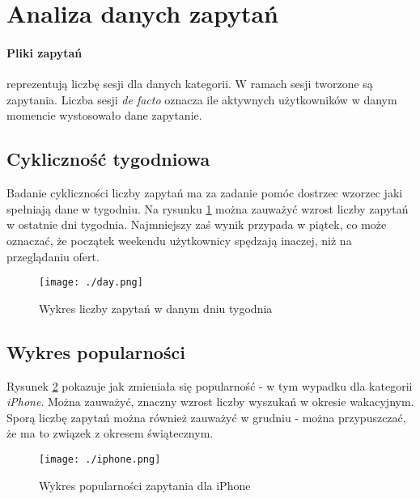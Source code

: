\documentclass[a4paper,11pt]{article}
\begin{document}
\section{Analiza danych zapytań} 
\paragraph{Pliki zapytań} reprezentują liczbę sesji dla danych kategorii. W ramach sesji tworzone są zapytania. Liczba sesji \textit{de facto} oznacza ile aktywnych użytkowników w danym momencie wystosowało dane zapytanie.


\subsection{Cykliczność tygodniowa}
Badanie cykliczności liczby zapytań ma za zadanie pomóc dostrzec wzorzec jaki spełniają dane w tygodniu. Na rysunku \ref{fig:day} można zauważyć wzrost liczby zapytań w ostatnie dni tygodnia. Najmniejszy zaś wynik przypada w piątek, co może oznaczać, że początek weekendu użytkownicy spędzają inaczej, niż na przeglądaniu ofert. 
   

\begin{figure}[H]
	\centering
	\texttt{[image: ./day.png]}
	\caption{\label{fig:day}Wykres liczby zapytań w danym dniu tygodnia}
\end{figure}

\subsection{Wykres popularności}
Rysunek \ref{fig:iphoine} pokazuje jak zmieniała się popularność - w tym wypadku dla kategorii \textit{iPhone}. Można zauważyć, znaczny wzrost liczby wyszukań w okresie wakacyjnym. Sporą liczbę zapytań można również zauważyć w grudniu - można przypuszczać, że ma to związek z okresem świątecznym.
   

\begin{figure}[H]
	\centering
	\texttt{[image: ./iphone.png]}
	\caption{\label{fig:iphoine}Wykres popularności zapytania dla iPhone}
\end{figure}
\end{document}
